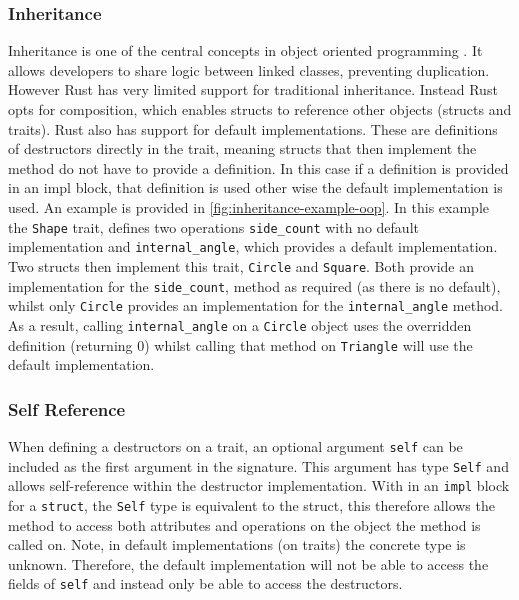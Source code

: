 \documentclass[ oneside,%
                    author={James Elgar},
                    degree={MEng},
                     title={Bidirectional transformer between functional and \\ object-oriented programming in Rust},
                  subtitle={}]{dissertation}
\newcommand{\rust}[1]{\texttt{#1}}
\begin{document}

\subsubsection{Inheritance}
\label{sec:background-inheritance}

Inheritance is one of the central concepts in object oriented programming \cite{cook_palsberg_1989}. It allows developers to share logic between linked classes, preventing duplication. 
However Rust has very limited support for traditional inheritance. Instead Rust opts for composition, which enables structs to reference other objects (structs and traits).
Rust also has support for default implementations. These are definitions of destructors directly in the trait, meaning structs that then implement the method do not have to provide a definition. In this case if a definition is provided in an impl block, that definition is used other wise the default implementation is used.
An example is provided in \autoref{fig:inheritance-example-oop}. In this example the \rust{Shape} trait, defines two operations \rust{side_count} with no default implementation and \rust{internal_angle}, which provides a default implementation.
Two structs then implement this trait, \rust{Circle} and \rust{Square}. Both provide an implementation for the \rust{side_count}, method as required (as there is no default), whilst only \rust{Circle} provides an implementation for the \rust{internal_angle} method.
As a result, calling \rust{internal_angle} on a \rust{Circle} object uses the overridden definition (returning 0) whilst calling that method on \rust{Triangle} will use the default implementation.

\subsubsection{Self Reference}
\label{sec:self-reference}

When defining a destructors on a trait, an optional argument \rust{self} can be included as the first argument in the signature. 
This argument has type \rust{Self} and allows self-reference within the destructor implementation.
With in an \rust{impl} block for a \rust{struct}, the \rust{Self} type is equivalent to the struct, this therefore allows the method to access both attributes and operations on the object the method is called on.
Note, in default implementations (on traits) the concrete type is unknown. Therefore, the default implementation will not be able to access the fields of \rust{self} and instead only be able to access the destructors.  
\end{document}
